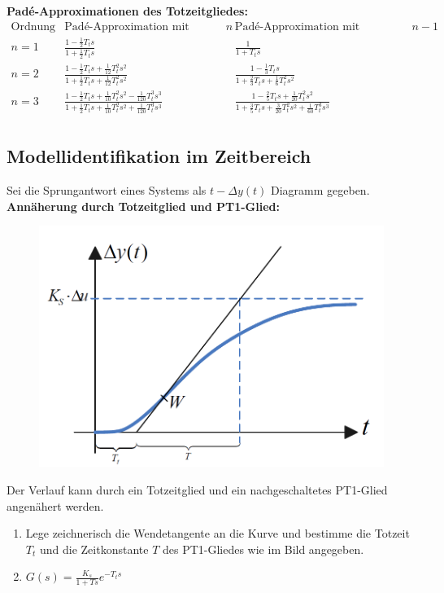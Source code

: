 \documentclass[10pt,a4paper]{article}
\renewcommand{\arraystretch}{1.5}
\begin{document}
\textbf{Padé-Approximationen des Totzeitgliedes:} \\
\renewcommand{\arraystretch}{2}
$\begin{array}{l|c|c}
	\text{Ordnung} & \text{Padé-Approximation mit Zählergrad }n & \text{Padé-Approximation mit Zählergrad }n-1 \\
	\hline
	n = 1 & \frac{1 - \frac 1 2 T_t s}{1 + \frac 1 2 T_t s} & \frac{1}{1 + T_t s} \\
	n = 2 & \frac{1 - \frac 1 2 T_t s + \frac 1 {12} T_t^2 s^2}{1 + \frac 1 2 T_t s + \frac 1 {12} T_t^2 s^2} & \frac{1 - \frac 1 3 T_t s}{1 + \frac 2 3 T_t s + \frac 1 6 T_t^2 s^2} \\
	n = 3 & \frac{1 - \frac 1 2 T_t s + \frac 1 {10} T_t^2 s^2 - \frac 1 {120} T_t^3 s^3}{1 + \frac 1 2 T_t s + \frac 1 {10} T_t^2 s^2 + \frac 1 {120} T_t^3 s^3} & \frac{1 - \frac 2 5 T_t s + \frac 1 {20} T_t^2 s^2}{1 + \frac 3 5 T_t s + \frac 3 {20} T_t^2 s^2 + \frac 1 {60} T_t^3 s^3} \\	
\end{array}$
\renewcommand{\arraystretch}{1.5}

\subsection{Modellidentifikation im Zeitbereich}
Sei die Sprungantwort eines Systems als $t-\Delta y(t)$ Diagramm gegeben. \\

\textbf{Annäherung durch Totzeitglied und PT1-Glied:} \\
\begin{figure}[H]
	\includegraphics[width = 0.4\columnwidth]{imgs/modellidentifikation_1.png}
\end{figure}
Der Verlauf kann durch ein Totzeitglied und ein nachgeschaltetes PT1-Glied angenähert werden.
\begin{enumerate}
	\item Lege zeichnerisch die Wendetangente an die Kurve und bestimme die Totzeit $T_t$ und die Zeitkonstante $T$ des PT1-Gliedes wie im Bild angegeben.
	\item $G(s) = \frac{K_s}{1 + Ts} e^{-T_ts}$
\end{enumerate}
\end{document}
